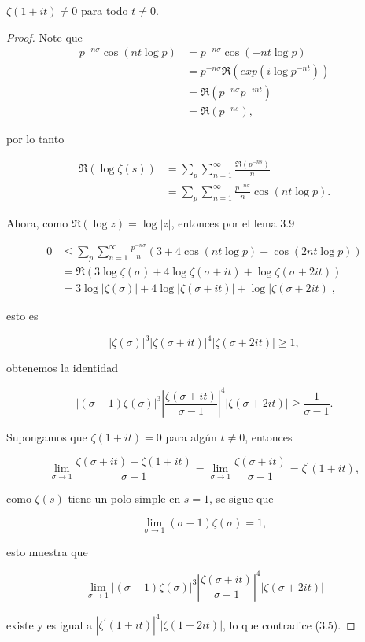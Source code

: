 \begin{theorem}
$\zeta(1+it)\neq 0$ para todo $t\neq 0$.
\end{theorem}

\begin{proof}
Note que
    \begin{align*}
        p^{-n\sigma}\cos(nt\log p)&=p^{-n\sigma}\cos(-nt\log p)\\
        &=p^{-n\sigma}\Re(exp(i\log p^{-nt}))\\
        &=\Re(p^{-n\sigma}p^{-int})\\
        &=\Re(p^{-ns})
    ,\end{align*}

por lo tanto

\begin{align*}
    \Re(\log\zeta(s))&=\sum_{p}\sum_{n=1}^{\infty} \frac{\Re(p^{-ns})}{n}\\
    &=\sum_{p}\sum_{n=1}^{\infty} \frac{p^{-n\sigma}}{n}\cos(nt\log p)
.\end{align*}

Ahora, como $\Re(\log z)=\log|z|$, entonces por el lema 3.9

\begin{align*}
    0&\leq \sum_p \sum_{n=1}^{\infty}\frac{p^{-n \sigma}}{n}(3+4 \cos (n t \log p)+\cos (2 n t \log p))\\
     &=\Re(3\log\zeta(\sigma)+4\log\zeta(\sigma+it)+\log\zeta(\sigma+2it))\\
    &=3 \log |\zeta(\sigma)|+4 \log |\zeta(\sigma+i t)|+\log |\zeta(\sigma+2 i t)|
,\end{align*}

esto es

$$
|\zeta(\sigma)|^3|\zeta(\sigma+i t)|^4|\zeta(\sigma+2 i t)| \geqslant 1,
$$

obtenemos la identidad

\begin{equation}
    |(\sigma-1) \zeta(\sigma)|^3\left|\frac{\zeta(\sigma+i t)}{\sigma-1}\right|^4|\zeta(\sigma+2 i t)| \geqslant \frac{1}{\sigma-1} .
\end{equation}

Supongamos que $\zeta(1+it)=0$ para algún $t\neq 0$, entonces

$$\lim_{\sigma \to 1}\frac{\zeta(\sigma+it)-\zeta(1+it)}{\sigma-1}=\lim_{\sigma \to 1}\frac{\zeta(\sigma+it)}{\sigma-1}=\zeta^{\prime}(1+it),$$

como $\zeta(s)$ tiene un polo simple en $s=1$, se sigue que

$$\lim_{\sigma \to 1} (\sigma-1)\zeta(\sigma)=1,$$

esto muestra que 

$$\lim _{\sigma \rightarrow 1}|(\sigma-1) \zeta(\sigma)|^3\left|\frac{\zeta(\sigma+i t)}{\sigma-1}\right|^4|\zeta(\sigma+2 i t)|$$

existe y es igual a $\left|\zeta^{\prime}(1+i t)\right|^4|\zeta(1+2 i t)|$, lo que contradice (3.5).
\end{proof}

